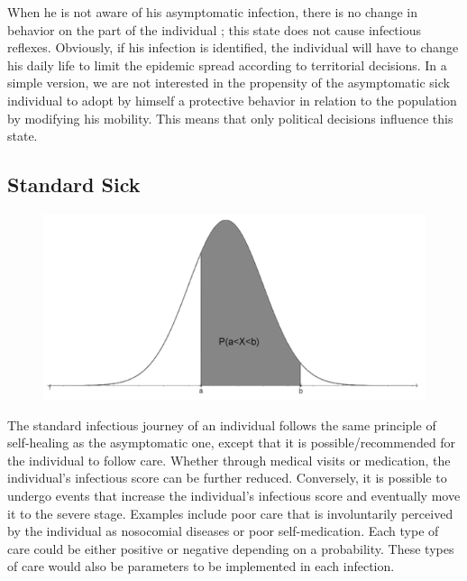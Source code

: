 When he is not aware of his asymptomatic infection, there is no change in behavior on the part of the individual ; this state does not cause infectious reflexes. Obviously, if his infection is identified, the individual will have to change his daily life to limit the epidemic spread according to territorial decisions. In a simple version, we are not interested in the propensity of the asymptomatic sick individual to adopt by himself a protective behavior in relation to the population by modifying his mobility. This means that only political decisions influence this state.\\

\subsection{Standard Sick}

\begin{figure}
  \centering
  \includegraphics[trim = 234 0 184 0, clip, width=\linewidth]{media/loi_gauss.png}
\end{figure}

The standard infectious journey of an individual follows the same principle of self-healing as the asymptomatic one, except that it is possible/recommended for the individual to follow care. Whether through medical visits or medication, the individual's infectious score can be further reduced. Conversely, it is possible to undergo events that increase the individual's infectious score and eventually move it to the severe stage. Examples include poor care that is involuntarily perceived by the individual as nosocomial diseases or poor self-medication. Each type of care could be either positive or negative depending on a probability. These types of care would also be parameters to be implemented in each infection.\\

